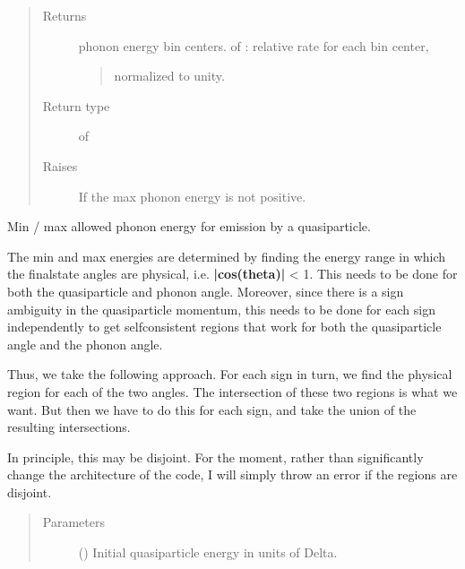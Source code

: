 \documentclass[letterpaper,10pt,english]{sphinxmanual}
\begin{document}
\begin{fulllineitems}
\begin{fulllineitems}
\begin{quote}
\begin{description}
\item[{Returns}] \leavevmode

phonon energy bin centers.
 of : relative rate for each bin center,
\begin{quote}

normalized to unity.
\end{quote}


\item[{Return type}] \leavevmode
{} of 

\item[{Raises}] \leavevmode
{} \textendash{} If the max phonon energy is not positive.

\end{description}\end{quote}

\end{fulllineitems}


\begin{fulllineitems}
\label{\detokenize{code_structure:scdc.interaction.QuasiparticlePhononEmission.phonon_energy_region}}
Min / max allowed phonon energy for emission by a quasiparticle.

The min and max energies are determined by finding the energy range
in which the final\sphinxhyphen{}state angles are physical, i.e. {\color{red}\bfseries{}|cos(theta)|} \textless{} 1.
This needs to be done for both the quasiparticle and phonon angle.
Moreover, since there is a sign ambiguity in the quasiparticle
momentum, this needs to be done for each sign independently to get
self\sphinxhyphen{}consistent regions that work for both the quasiparticle angle and
the phonon angle.

Thus, we take the following approach. For each sign in turn, we find
the physical region for each of the two angles. The intersection of
these two regions is what we want. But then we have to do this for each
sign, and take the union of the resulting intersections.

In principle, this may be disjoint. For the moment, rather than
significantly change the architecture of the code, I will simply throw
an error if the regions are disjoint.
\begin{quote}\begin{description}
\item[{Parameters}] \leavevmode
{} () \textendash{} Initial quasiparticle energy in units of Delta.


\end{description}
\end{quote}
\end{fulllineitems}
\end{fulllineitems}
\end{document}
